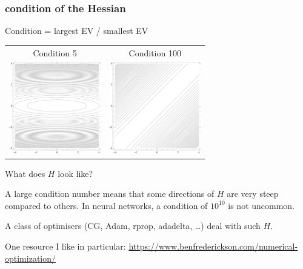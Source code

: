 \documentclass[USenglish,pdftex,compress,10pt,svgnamesi,handout]{beamer}
\begin{document}
\begin{frame}
\frametitle{condition of the Hessian}
Condition = largest EV / smallest EV

\bigskip

\begin{tabular}{cc}
Condition 5 & Condition 100\\
\includegraphics[height=40mm]{pics/H5.pdf}
&\includegraphics[height=40mm]{pics/H100.pdf}
\end{tabular}

What does $H$ look like?

A large condition number means that some directions of $H$ are very steep compared to others.
In neural networks, a condition of $10^{10}$ is not uncommon.

A class of optimisers (CG, Adam, rprop, adadelta, \dots) deal with such $H$.
\end{frame}


\begin{frame}
One resource I like in particular: \url{https://www.benfrederickson.com/numerical-optimization/}
\end{frame}
\end{document}
